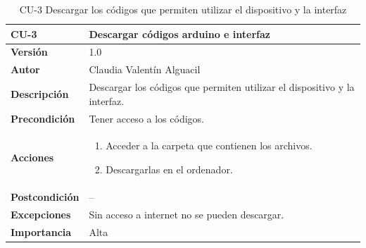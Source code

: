 \begin{table}[p]
	\centering
	\begin{tabularx}{\linewidth}{ p{} p{} }
		\toprule
		\textbf{CU-3}    & \textbf{Descargar códigos arduino e interfaz}\\
		\toprule
		\textbf{Versión}              & 1.0    \\
		\textbf{Autor}                & Claudia Valentín Alguacil \\
		
		\textbf{Descripción}          & Descargar los códigos que permiten utilizar el dispositivo y la interfaz. \\
		\textbf{Precondición}         & Tener acceso a los códigos. \\
		\textbf{Acciones}             &
		\begin{enumerate}
			\def\labelenumi{\arabic{enumi}.}
			\tightlist
			\item Acceder a la carpeta que contienen los archivos.
			\item Descargarlas en el ordenador.
		\end{enumerate}\\
		\textbf{Postcondición}        &  -- \\
		\textbf{Excepciones}          & Sin acceso a internet no se pueden descargar. \\
		\textbf{Importancia}          & Alta \\
		\bottomrule
	\end{tabularx}
	\caption{CU-3 Descargar los códigos que permiten utilizar el dispositivo y la interfaz}
\end{table}
